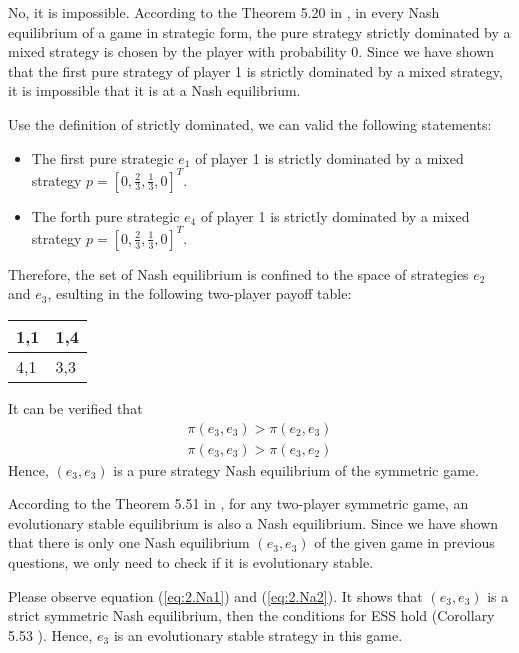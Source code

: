 \documentclass[a4 paper, 12pt]{article}
\begin{document}
 No, it is impossible. According to the Theorem 5.20 in \cite{b1}, in every Nash equilibrium of a game in strategic form, the pure strategy strictly dominated by a mixed strategy is chosen by the player with probability 0. Since we have shown that the first pure strategy of player 1 is strictly dominated by a mixed strategy, it is impossible that it is at a Nash equilibrium.

 Use the definition of strictly dominated, we can valid the following statements:
\begin{itemize}
        \item The first pure strategic $e_1$ of player 1 is strictly dominated by a mixed strategy $p = [0, \frac{2}{3}, \frac{1}{3}, 0]^T$.
        \item The forth pure strategic $e_4$ of player 1 is strictly dominated by a mixed strategy $p = [0, \frac{2}{3}, \frac{1}{3}, 0]^T$.
\end{itemize}
Therefore, the set of Nash equilibrium is confined to the space of strategies $e_2$ and $e_3$, esulting in the following two-player payoff table:
\begin{center}
        \begin{tabular}{ | m{1em} | m{1em}| } 
        \hline
        1,1& 1,4 \\ 
        \hline
        4,1 & 3,3 \\ 
        \hline
        \end{tabular}
\end{center}
It can be verified that 
\begin{align}
        \pi(e_3,e_3) > \pi(e_2,e_3) \label{eq:2.Na1} \\
        \pi(e_3,e_3) > \pi(e_3,e_2) \label{eq:2.Na2}
\end{align}
Hence, $(e_3,e_3)$ is a pure strategy Nash equilibrium of the symmetric game.

 According to the Theorem 5.51 in \cite{b1}, for any two-player symmetric game, an evolutionary stable equilibrium is also a Nash equilibrium. Since we have shown that there is only one Nash equilibrium $(e_3,e_3)$ of the given game in previous questions, we only need to check if it is evolutionary stable. 

Please observe equation (\ref{eq:2.Na1}) and (\ref{eq:2.Na2}). It shows that $(e_3,e_3)$ is a strict symmetric Nash equilibrium, then the conditions for ESS hold (Corollary 5.53 \cite{b1}). Hence, $e_3$ is an evolutionary stable strategy in this game.
\end{document}
